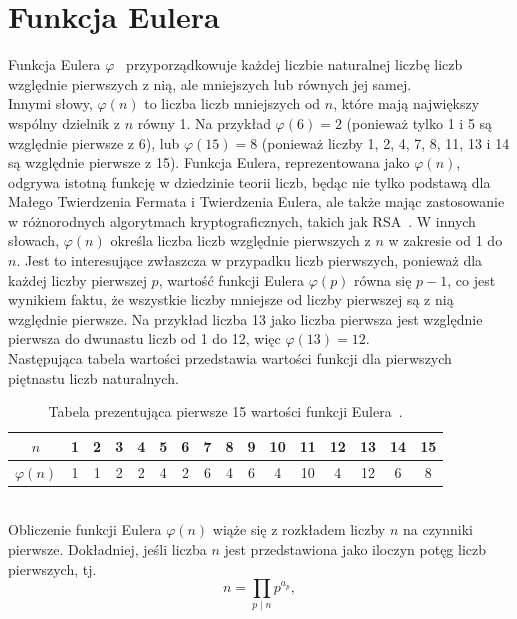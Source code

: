 \documentclass{SGGW-thesis}
\begin{document}
	\section{Funkcja Eulera}
	Funkcja Eulera \(\varphi\)~\cite{ajakubiec}\cite{r26modulo} przyporządkowuje każdej liczbie naturalnej liczbę liczb względnie pierwszych z nią, ale mniejszych lub równych jej samej.
	\\
	\noindent Innymi słowy, $\varphi(n)$ to liczba liczb mniejszych od $n$, które mają największy wspólny dzielnik z $n$ równy 1. Na przykład $\varphi(6) = 2$ (ponieważ tylko 1 i 5 są względnie pierwsze z 6), lub $\varphi(15) = 8$ (ponieważ liczby 1, 2, 4, 7, 8, 11, 13 i 14 są względnie pierwsze z 15).
	Funkcja Eulera, reprezentowana jako \( \varphi(n) \), odgrywa istotną funkcję w dziedzinie teorii liczb, będąc nie tylko podstawą dla Małego Twierdzenia Fermata i Twierdzenia Eulera, ale także mając zastosowanie w różnorodnych algorytmach kryptograficznych, takich jak RSA~\cite{rsa}. W innych słowach, \( \varphi(n) \) określa liczba liczb względnie pierwszych z \( n \) w zakresie od 1 do \( n \). Jest to interesujące zwłaszcza w przypadku liczb pierwszych, ponieważ dla każdej liczby pierwszej \( p \), wartość funkcji Eulera \( \varphi(p) \) równa się \( p-1 \), co jest wynikiem faktu, że wszystkie liczby mniejsze od liczby pierwszej są z nią względnie pierwsze. Na przykład liczba 13 jako liczba pierwsza jest względnie pierwsza do dwunastu liczb od 1 do 12, więc \(\varphi(13) = 12\).
	\\
	Następująca tabela wartości przedstawia wartości funkcji dla pierwszych piętnastu liczb naturalnych.
	\\
	\begin{table}[h]
		\centering
		\begin{tabular}{|c|c|c|c|c|c|c|c|c|c|c|c|c|c|c|c|}
			\hline
			$n$ & 1 & 2 & 3 & 4 & 5 & 6 & 7 & 8 & 9 & 10 & 11 & 12 & 13 & 14 & 15 \\
			\hline
			$\varphi(n)$ & 1 & 1 & 2 & 2 & 4 & 2 & 6 & 4 & 6 & 4 & 10 & 4 & 12 & 6 & 8 \\
			\hline
		\end{tabular}
		\caption{Tabela prezentująca pierwsze 15 wartości funkcji Eulera~\cite{r26modulo}.}
	\end{table}
	\\
	Obliczenie funkcji Eulera \( \varphi(n) \) wiąże się z rozkładem liczby \( n \) na czynniki pierwsze. Dokładniej, jeśli liczba \( n \) jest przedstawiona jako iloczyn potęg liczb pierwszych, tj.
	\begin{equation}
		n = \prod_{p \mid n} p^{a_p},
	\end{equation}
\end{document}
